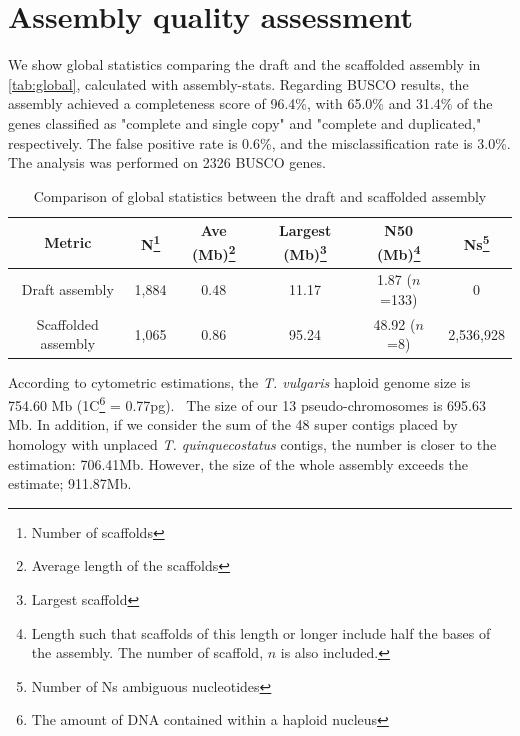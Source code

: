 \section*{Assembly quality assessment}

We show global statistics comparing the draft and the scaffolded assembly in \autoref{tab:global}, calculated with assembly-stats. Regarding BUSCO results, the assembly achieved a completeness score of 96.4\%, with 65.0\% and 31.4\% of the genes classified as "complete and single copy" and "complete and duplicated," respectively. The false positive rate is 0.6\%, and the misclassification rate is 3.0\%. The analysis was performed on 2326 BUSCO genes. 

\begin{table}[h!]
    \begin{minipage}{\linewidth}
    \renewcommand\thefootnote{\thempfootnote}
    \centering
    \begin{tabular}{@{}cccccc@{}}
        \toprule
        Metric              & N\footnote{Number of scaffolds}    & Ave (Mb)\footnote{Average length of the scaffolds} & Largest (Mb)\footnote{Largest scaffold} & N50 (Mb)\footnote{Length such that scaffolds of this length or longer include half the bases of the assembly. The number of scaffold, $n$ is also included.}     & Ns\footnote{Number of Ns ambiguous nucleotides}      \\ \midrule
        Draft assembly      & 1,884 & 0.48     & 11.17        & 1.87 ($n$=133) & 0       \\
        Scaffolded assembly & 1,065 & 0.86     & 95.24        & 48.92 ($n$=8)  & 2,536,928 \\ \bottomrule
        \end{tabular}
        \caption{Comparison of global statistics between the draft and scaffolded assembly}
        \label{tab:global}
\end{minipage}
\end{table}

According to cytometric estimations, the \textit{T. vulgaris} haploid genome size is 754.60 Mb (1C\footnote{The amount of DNA contained within a haploid nucleus} = 0.77pg).~\cite{marieCytometricExercisePlant1993,PlantDNACvalues} The size of our 13 pseudo-chromosomes is 695.63 Mb. In addition, if we consider the sum of the 48 super contigs placed by homology with unplaced \textit{T. quinquecostatus} contigs, the number is closer to the estimation:  706.41Mb. However, the size of the whole assembly exceeds the estimate; 911.87Mb.\\


